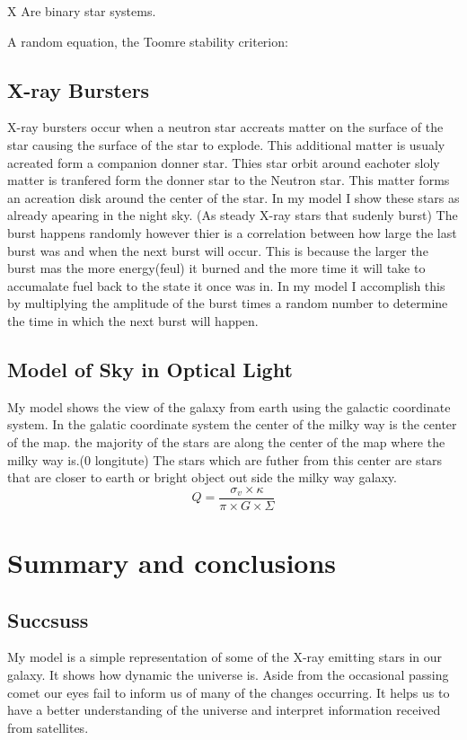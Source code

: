 \documentclass[final,6p,times,twocolumn,authoryear]{elsarticle}
\begin{document}
X
Are binary star systems.

A random equation, the Toomre stability criterion:

\subsection{X-ray Bursters}

X-ray bursters occur when a neutron star accreats matter on the surface of the star causing the surface of the star to explode. This additional matter is usualy acreated form a companion donner star. Thies star orbit around eachoter sloly matter is tranfered form the donner star to the Neutron star. This matter forms an acreation disk around the center of the star.
In my model I show these stars as already apearing in the night sky. (As steady X-ray stars that sudenly burst) The burst happens randomly however thier is a correlation between how large the last burst was and when the next burst will occur. This is because the larger the burst mas the more energy(feul) it burned and the more time it will take to accumalate fuel back to the state it once was in. In my model I accomplish this by multiplying the amplitude of the burst times a random number to determine the time in which the next burst will happen. 

\subsection{Model of Sky in Optical Light}
My model shows the view of the galaxy from earth using the galactic coordinate system. In the galatic coordinate system the center of the milky way is the center of the map. the majority of the stars are along the center of the map where the milky way is.(0 longitute) The stars which are futher from this center are stars that are closer to earth or bright object out side the milky way galaxy.
\begin{equation}
    Q = \frac{\sigma_v \times \kappa}{\pi \times G \times \Sigma}
\end{equation}

\section{Summary and conclusions}
\subsection{Succsuss}
My model is a simple representation of some of the X-ray emitting stars in our galaxy. It shows how dynamic the universe is. Aside from the occasional passing comet our eyes fail to inform us of many of the changes occurring. It helps us to have a better understanding of the universe and interpret information received from satellites.
\end{document}
